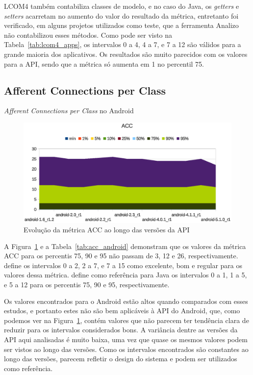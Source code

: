 LCOM4 também contabiliza classes de modelo, e no caso do Java, os \textit{getters} e \textit{setters} acarretam no aumento do valor do resultado da métrica\cite{meirelles2013}, entretanto foi verificado, em alguns projetos utilizados como teste, que a ferramenta Analizo não contabilizou esses métodos. Como pode ser visto na Tabela~\ref{tab:lcom4_apps}, os intervalos 0 a 4, 4 a 7, e 7 a 12 são válidos para a grande maioria dos aplicativos. Os resultados são muito parecidos com os valores para a API, sendo que a métrica só aumenta em 1 no percentil 75.

\subsection{Afferent Connections per Class}

\begin{table}[!htb]
\centering
{}

\caption{\textit{Afferent Connections per Class} no Android}
\label{tab:acc_android}
\end{table}

\begin{figure}[!htb]
\centering
\includegraphics [keepaspectratio=true,scale=0.85]{figuras/graphs/acc_android.eps}
\caption{Evolução da métrica ACC ao longo das versões da API}
\label{fig:acc_android}
\end{figure}

A Figura~\ref{fig:acc_android} e a Tabela~\ref{tab:acc_android} demonstram que os valores da métrica ACC para os percentis 75, 90 e 95 não passam de 3, 12 e 26, respectivamente.  define os intervalos 0 a 2, 2 a 7, e 7 a 15 como excelente, bom e regular para os valores dessa métrica.  define como referência para Java os intervalos 0 a 1, 1 a 5, e 5 a 12 para os percentis 75, 90 e 95, respectivamente.

Os valores encontrados para o Android estão altos quando comparados com esses estudos, e portanto estes não são bem aplicáveis à API do Android, que, como podemos ver na Figura~\ref{fig:acc_android}, contém valores que não parecem ter tendência clara de reduzir para os intervalos considerados bons. A variância dentre as versões da API aqui analisadas é muito baixa, uma vez que quase os mesmos valores podem ser vistos ao longo das versões. Como os intervalos encontrados são constantes ao longo das versões, parecem refletir o design do sistema e podem ser utilizados como referência.

